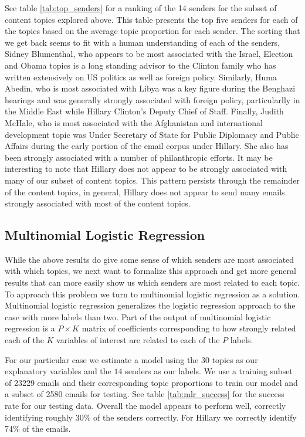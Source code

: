 \documentclass[12pt]{article}
\theoremstyle{definition}
\theoremstyle{algodesc}
\begin{document}
See table \ref{tab:top_senders} for a ranking of the 14 senders for the subset of content topics explored above.  This table presents the top five senders for each of the topics based on the average topic proportion for each sender.  The sorting that we get back seems to fit with a human understanding of each of the senders, Sidney Blumenthal, who appears to be most associated with the Israel, Election and Obama topics is a long standing advisor to the Clinton family who has written extensively on US politics as well as foreign policy.  Similarly, Huma Abedin, who is most associated with Libya was a key figure during the Benghazi hearings and was generally strongly associated with foreign policy, particularlly in the Middle East while Hillary Clinton's Deputy Chief of Staff.  Finally, Judith McHale, who is most associated with the Afghanistan and international development topic was Under Secretary of State for Public Diplomacy and Public Affairs during the early portion of the email corpus under Hillary.  She also has been strongly associated with a number of philanthropic efforts.  It may be interesting to note that Hillary does not appear to be strongly associated with many of our subset of content topics.  This pattern persists through the remainder of the content topics, in general, Hillary does not appear to send many emails strongly associated with most of the content topics.

\subsection{Multinomial Logistic Regression}

While the above results do give some sense of which senders are most associated with which topics, we next want to formalize this approach and get more general results that can more easily show us which senders are most related to each topic.  To approach this problem we turn to multinomial logistic regression as a solution.  Multinomial logistic regression generalizes the logistic regression approach to the case with more labels than two.  Part of the output of multinomial logistic regression is a $P \times K$ matrix of coefficients corresponding to how strongly related each of the $K$ variables of interest are related to each of the $P$ labels.

For our particular case we estimate a model using the $30$ topics as our explanatory variables and the $14$ senders as our labels.  We use a training subset of 23229 emails and their corresponding topic proportions to train our model and a subset of 2580 emails for testing.  See table \ref{tab:mlr_success} for the success rate for our testing data.  Overall the model appears to perform well, correctly identifying roughly 30\% of the senders correctly.  For Hillary we correctly identify 74\% of the emails.
\end{document}
